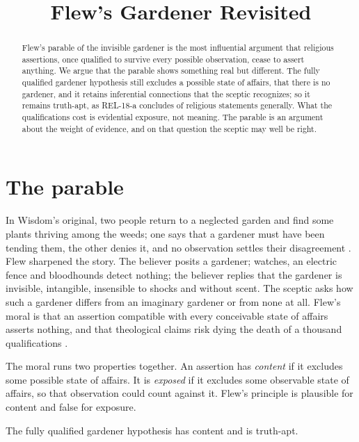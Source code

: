 \documentclass{situationist-preprint}
\title{Flew's Gardener Revisited}
\begin{document}
\maketitle

\begin{abstract}
Flew's parable of the invisible gardener is the most influential argument that religious assertions, once qualified to survive every possible observation, cease to assert anything. We argue that the parable shows something real but different. The fully qualified gardener hypothesis still excludes a possible state of affairs, that there is no gardener, and it retains inferential connections that the sceptic recognizes; so it remains truth-apt, as REL-18-a concludes of religious statements generally. What the qualifications cost is evidential exposure, not meaning. The parable is an argument about the weight of evidence, and on that question the sceptic may well be right.
\end{abstract}

\section{The parable}

In Wisdom's original, two people return to a neglected garden and find some plants thriving among the weeds; one says that a gardener must have been tending them, the other denies it, and no observation settles their disagreement \citep{Wisdom1945}. Flew sharpened the story. The believer posits a gardener; watches, an electric fence and bloodhounds detect nothing; the believer replies that the gardener is invisible, intangible, insensible to shocks and without scent. The sceptic asks how such a gardener differs from an imaginary gardener or from none at all. Flew's moral is that an assertion compatible with every conceivable state of affairs asserts nothing, and that theological claims risk dying the death of a thousand qualifications \citep{Flew1955}.

The moral runs two properties together. An assertion has \emph{content} if it excludes some possible state of affairs. It is \emph{exposed} if it excludes some observable state of affairs, so that observation could count against it. Flew's principle is plausible for content and false for exposure.

\begin{proposition}\label{p:content}
The fully qualified gardener hypothesis has content and is truth-apt.
\end{proposition}
\end{document}

